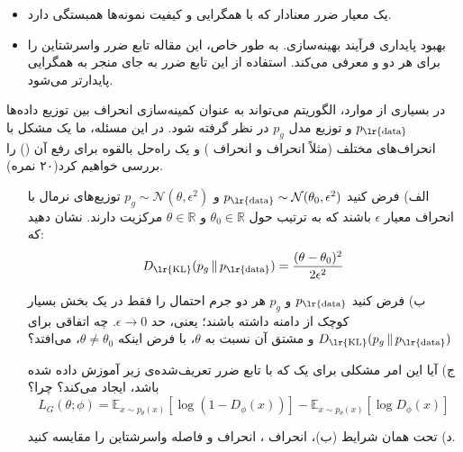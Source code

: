 \documentclass[12pt]{article}
\begin{document}
\begin{enumerate}
    \begin{itemize}
      \item یک معیار ضرر معنادار که با همگرایی  و کیفیت نمونه‌ها همبستگی دارد.
      \item بهبود پایداری فرآیند بهینه‌سازی. به طور خاص، این مقاله تابع ضرر واسرشتاین را برای هر دو  و  معرفی می‌کند. استفاده از این تابع ضرر به جای  منجر به همگرایی پایدارتر  می‌شود.
    \end{itemize}
    
    در بسیاری از موارد، الگوریتم  می‌تواند به عنوان کمینه‌سازی انحراف بین توزیع داده‌ها \( p_{\text{\lr{data}}} \) و توزیع مدل \( p_g \) در نظر گرفته شود. در این مسئله، ما یک مشکل با انحراف‌های مختلف (مثلاً انحراف  و انحراف ) و یک راه‌حل بالقوه برای رفع آن () را بررسی خواهیم کرد(۲۰ نمره).
    
    \begin{enumerate}
        \item[الف)] فرض کنید \( p_{\text{\lr{data}}} \sim \mathcal{N}(\theta_0, \epsilon^2) \) و \( p_g \sim \mathcal{N}(\theta, \epsilon^2) \) توزیع‌های نرمال با انحراف معیار \( \epsilon \) باشند که به ترتیب حول \( \theta_0 \in \mathbb{R} \) و \( \theta \in \mathbb{R} \) مرکزیت دارند. نشان دهید که:
        \[
        D_{\text{\lr{KL}}}(p_g \,\|\, p_{\text{\lr{data}}}) = \frac{(\theta - \theta_0)^2}{2\epsilon^2}
        \]
    
        \item[ب)] فرض کنید \( p_{\text{\lr{data}}} \) و \( p_g \) هر دو جرم احتمال را فقط در یک بخش بسیار کوچک از دامنه داشته باشند؛ یعنی، حد \( \epsilon \rightarrow 0 \). چه اتفاقی برای \( D_{\text{\lr{KL}}}(p_g \,\|\, p_{\text{\lr{data}}}) \) و مشتق آن نسبت به \( \theta \)، با فرض اینکه \( \theta \ne \theta_0 \)، می‌افتد؟
    
        \item[ج)] آیا این امر مشکلی برای یک  که با تابع ضرر تعریف‌شده‌ی زیر آموزش داده شده‌ باشد، ایجاد می‌کند؟ چرا؟
        \[
        L_G(\theta; \phi) = \mathbb{E}_{x \sim p_\theta(x)}[\log(1 - D_\phi(x))] - \mathbb{E}_{x \sim p_\theta(x)}[\log D_\phi(x)]
        \]
    
        \item[د)] تحت همان شرایط (ب)، انحراف ، انحراف  و فاصله واسرشتاین را مقایسه کنید.
    \end{enumerate}


\end{enumerate}
\end{document}
